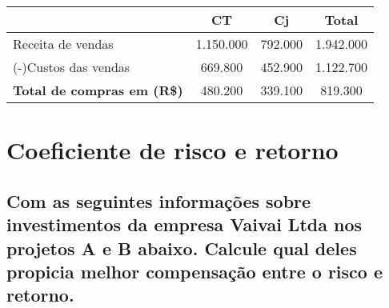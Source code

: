 \documentclass[report]{uftex}
\begin{document}
 \begin{table}[h]
	\centering
	\begin{tabular}{l|c|c|c}
		\hline
		& \textbf{CT} & \textbf{Cj} & \textbf{Total} \\ 
		\hline
		Receita de vendas & 1.150.000 & 792.000 & 1.942.000 \\
		\hline
		(-)Custos das vendas & 669.800 & 452.900 & 1.122.700 \\
		\hline
		\textbf{Total de compras em (R\$)} & 480.200 & 339.100 & 819.300 \\
	\end{tabular}
\end{table}
\chapter{Coeficiente de risco e retorno}

\section{Com as seguintes informações sobre investimentos da empresa Vaivai Ltda nos projetos A e B abaixo. Calcule qual deles propicia melhor compensação entre o risco e retorno.}
\end{document}
